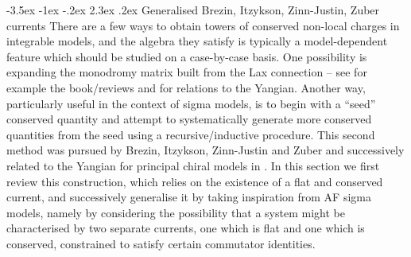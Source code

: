 \documentclass[12pt]{article}
\makeatletter
\renewcommand\section{\@startsection {section}{1}{\z@}%
                                   {-3.5ex \@plus -1ex \@minus -.2ex}%
                                   {2.3ex \@plus.2ex}%
                                   {\normalfont\large\bfseries}}
\numberwithin{equation}{section}
\makeatother
\begin{document}
\section{Generalised Brezin, Itzykson, Zinn-Justin, Zuber currents}\label{section:BIZZ-charges}
There are a few ways to obtain towers of conserved non-local charges in integrable models, and the algebra they satisfy is typically a model-dependent feature which should be studied on a case-by-case basis. One possibility is expanding the monodromy matrix built from the Lax connection -- see for example the book/reviews \cite{Babelon:2003qtg,Torrielli:2016ufi,Loebbert:2016cdm,Driezen:2021cpd} and \cite{Itsios:2014vfa} for relations to the Yangian. Another way, particularly useful in the context of sigma models, is to begin with a ``seed'' conserved quantity and attempt to systematically generate more conserved quantities from the seed using a recursive/inductive procedure. This second method was pursued by Brezin, Itzykson, Zinn-Justin and
Zuber \cite{BREZIN1979442} and successively related to the Yangian for principal chiral models in \cite{MacKay:1992he}. In this section we first review this construction, which relies on the existence of a flat and conserved current, and successively generalise it by taking inspiration from AF sigma models, namely by considering the possibility that a system might be characterised by two separate currents, one which is flat and one which is conserved, constrained to satisfy certain commutator identities.
\end{document}
